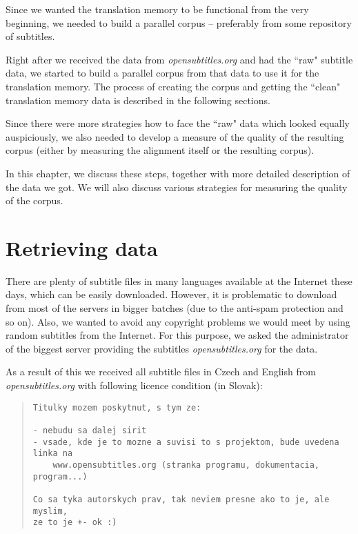 \label{chap:building_corpus}

Since we wanted the translation memory to be functional from the very beginning, we needed to build a parallel corpus -- preferably from some repository of subtitles. 

Right after we received the data from \emph{opensubtitles.org} and had the ``raw" subtitle data, we started to build a parallel corpus from that data to use it for the translation memory. The process of creating the corpus and getting the ``clean" translation memory data is described in the following sections.

Since there were more strategies how to face the ``raw" data which looked equally auspiciously, we also needed to develop a measure of the quality of the resulting corpus (either by measuring the alignment itself or the resulting corpus).

In this chapter, we discuss these steps, together with more detailed description of the data we got. We will also discuss various strategies for measuring the quality of the corpus.

\section{Retrieving data}

There are plenty of subtitle files in many languages available at the Internet these days, which can be easily downloaded. However, it is problematic to download from most of the servers in bigger batches (due to the anti-spam protection and so on). Also, we wanted to avoid any copyright problems we would meet by using random subtitles from the Internet. For this purpose, we asked the administrator of the biggest server providing the subtitles \emph{opensubtitles.org} for the data.

As a result of this we received all subtitle files in Czech and English from \emph{opensubtitles.org} with following licence condition (in Slovak):

\begin{quote}
\begin{verbatim}
Titulky mozem poskytnut, s tym ze:

- nebudu sa dalej sirit
- vsade, kde je to mozne a suvisi to s projektom, bude uvedena linka na
    www.opensubtitles.org (stranka programu, dokumentacia, program...)

Co sa tyka autorskych prav, tak neviem presne ako to je, ale myslim,
ze to je +- ok :)
\end{verbatim}
\end{quote}

